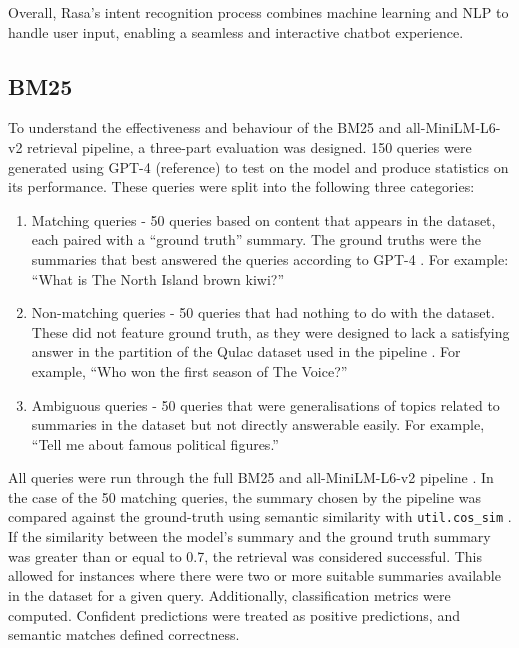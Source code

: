 \documentclass[11pt]{article}
\begin{document}
Overall, Rasa's intent recognition process combines machine learning and NLP to handle user input, enabling a seamless and interactive chatbot experience.

\subsection{BM25}
To understand the effectiveness and behaviour of the BM25 and all-MiniLM-L6-v2 retrieval pipeline, a three-part evaluation was designed. 150 queries were generated using GPT-4 (reference) to test on the model and produce statistics on its performance. These queries were split into the following three categories:
\begin{enumerate}
\item Matching queries - 50 queries based on content that appears in the dataset, each paired with a “ground truth” summary. The ground truths were the summaries that best answered the queries according to GPT-4 \cite{OpenAI2025}. For example: “What is The North Island brown kiwi?”
\item Non-matching queries - 50 queries that had nothing to do with the dataset. These did not feature ground truth, as they were designed to lack a satisfying answer in the partition of the Qulac dataset used in the pipeline \cite{Aliannejadi2021}. For example, “Who won the first season of The Voice?”
\item Ambiguous queries - 50 queries that were generalisations of topics related to summaries in the dataset but not directly answerable easily. For example, “Tell me about famous political figures.”
\end{enumerate}

All queries were run through the full BM25 and all-MiniLM-L6-v2 pipeline \cite{Brown2022,Tomaarsen2025a}. In the case of the 50 matching queries, the summary chosen by the pipeline was compared against the ground-truth using semantic similarity with \texttt{util.cos\_sim} \cite{Tomaarsen2025b}. If the similarity between the model's summary and the ground truth summary was greater than or equal to 0.7, the retrieval was considered successful. This allowed for instances where there were two or more suitable summaries available in the dataset for a given query. Additionally, classification metrics were computed. Confident predictions were treated as positive predictions, and semantic matches defined correctness.
\end{document}
